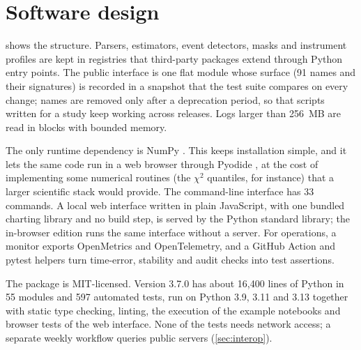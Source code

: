 \documentclass[11pt,a4paper]{article}
\begin{document}
\section{Software design}\label{sec:design}

 shows the structure. Parsers, estimators, event detectors, masks and
instrument profiles are kept in registries that third-party packages extend through Python entry
points. The public interface is one flat module whose surface (91 names and their signatures) is
recorded in a snapshot that the test suite compares on every change; names are removed only after a
deprecation period, so that scripts written for a study keep working across releases. Logs larger than
256~MB are read in blocks with bounded memory.

The only runtime dependency is NumPy \citep{harris2020}. This keeps installation simple, and it lets the
same code run in a web browser through Pyodide \citep{pyodide}, at the cost of implementing some
numerical routines (the $\chi^2$ quantiles, for instance) that a larger scientific stack would provide.
The command-line interface has 33 commands. A local web interface written in plain JavaScript, with
one bundled charting library \citep{uplot} and no build step, is served by the Python standard library;
the in-browser edition runs the same interface without a server. For operations, a monitor exports
OpenMetrics and OpenTelemetry, and a GitHub Action and pytest helpers turn time-error, stability and
audit checks into test assertions.

The package is MIT-licensed. Version 3.7.0 has about 16{,}400 lines of Python in 55 modules and 597
automated tests, run on Python 3.9, 3.11 and 3.13 together with static type checking, linting, the
execution of the example notebooks and browser tests of the web interface. None of the tests needs
network access; a separate weekly workflow queries public servers (\cref{sec:interop}).
\end{document}
